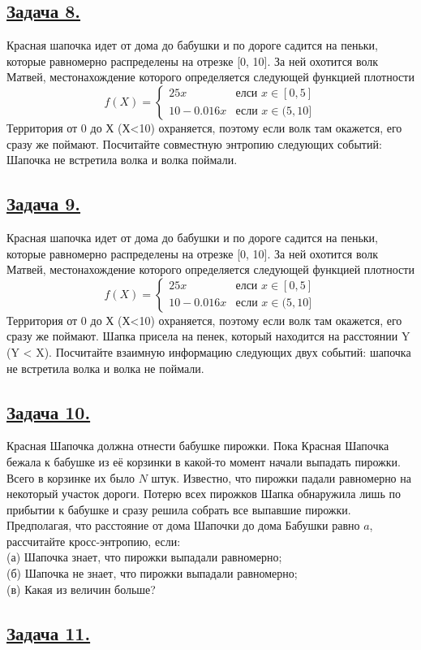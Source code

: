 \subsection*{\hyperref[sec:sol_problem8]{Задача 8.}}\label{sec:problem8} Красная шапочка идет от дома до бабушки и по дороге садится на пеньки, которые равномерно распределены на отрезке [0, 10]. За ней охотится волк Матвей, местонахождение которого определяется следующей функцией плотности 
\begin{equation*}
f(X) = 
 \begin{cases}
   25x &\text{елси $x \in [0, 5]$}\\
   10 - 0.016x &\text{если $x \in (5, 10]$}
 \end{cases}
\end{equation*}
Территория от 0 до Х (Х<10) охраняется, поэтому если волк там окажется, его сразу же поймают. Посчитайте совместную энтропию следующих событий: Шапочка не встретила волка и волка поймали. 

\subsection*{\hyperref[sec:sol_problem9]{Задача 9.}}\label{sec:problem9} Красная шапочка идет от дома до бабушки и по дороге садится на пеньки, которые равномерно распределены на отрезке [0, 10]. За ней охотится волк Матвей, местонахождение которого определяется следующей функцией плотности
\begin{equation*}
f(X) = 
 \begin{cases}
   25x &\text{елси $x \in [0, 5]$}\\
   10 - 0.016x &\text{если $x \in (5, 10]$}
 \end{cases}
\end{equation*}
Территория от 0 до Х (Х<10) охраняется, поэтому если волк там окажется, его сразу же поймают. Шапка присела на пенек, который находится на расстоянии Y (Y < X). Посчитайте взаимную информацию следующих двух событий: шапочка не встретила волка и волка не поймали. 
 
\subsection*{\hyperref[sec:sol_problem10]{Задача 10.}}\label{sec:problem10} Красная Шапочка должна отнести бабушке пирожки. Пока Красная Шапочка бежала к бабушке из её корзинки в какой-то момент начали выпадать пирожки. Всего в корзинке их было $N$ штук. Известно, что пирожки падали равномерно на некоторый участок дороги. Потерю всех пирожков Шапка обнаружила лишь по прибытии к бабушке и сразу решила собрать все выпавшие пирожки. Предполагая, что расстояние от дома Шапочки до дома Бабушки равно $a$, рассчитайте кросс-энтропию, если: \\
(а) Шапочка знает, что пирожки выпадали равномерно; \\
(б) Шапочка не знает, что пирожки выпадали равномерно; \\
(в) Какая из величин больше?

\subsection*{\hyperref[sec:sol_problem11]{Задача 11.}}\label{sec:problem11}
